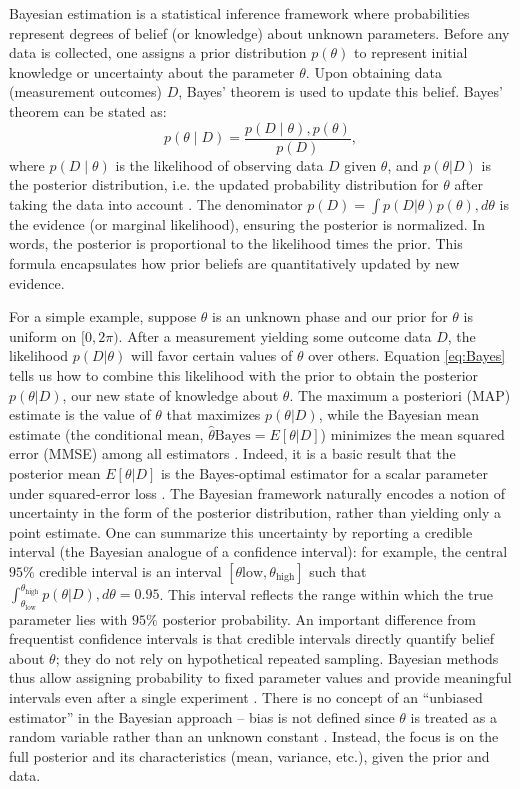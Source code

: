 Bayesian estimation is a statistical inference framework where
probabilities represent degrees of belief (or knowledge) about unknown
parameters. Before any data is collected, one assigns a prior
distribution $p(\theta)$ to represent initial knowledge or uncertainty
about the parameter $\theta$. Upon obtaining data (measurement
outcomes) $D$, Bayes’ theorem is used to update this belief. Bayes’
theorem can be stated as:
\begin{equation}
p(\theta \mid D) = \frac{p(D \mid \theta), p(\theta)}{p(D)},
\label{eq:Bayes}
\end{equation}
where $p(D \mid \theta)$ is the likelihood of observing data $D$ given
$\theta$, and $p(\theta|D)$ is the posterior distribution, i.e. the
updated probability distribution for $\theta$ after taking the data
into account . The denominator $p(D) = \int
p(D|\theta)p(\theta),d\theta$ is the evidence (or marginal
likelihood), ensuring the posterior is normalized. In words, the
posterior is proportional to the likelihood times the prior. This
formula encapsulates how prior beliefs are quantitatively updated by
new evidence.



For a simple example, suppose $\theta$ is an unknown phase and our
prior for $\theta$ is uniform on $[0,2\pi)$. After a measurement
  yielding some outcome data $D$, the likelihood $p(D|\theta)$ will
  favor certain values of $\theta$ over others. Equation
  \eqref{eq:Bayes} tells us how to combine this likelihood with the
  prior to obtain the posterior $p(\theta|D)$, our new state of
  knowledge about $\theta$. The maximum a posteriori (MAP) estimate is
  the value of $\theta$ that maximizes $p(\theta|D)$, while the
  Bayesian mean estimate (the conditional mean,
  $\hat{\theta}{\text{Bayes}} = E[\theta | D]$) minimizes the mean
  squared error (MMSE) among all estimators . Indeed, it is a basic
  result that the posterior mean $E[\theta|D]$ is the Bayes-optimal
  estimator for a scalar parameter under squared-error loss . The
  Bayesian framework naturally encodes a notion of uncertainty in the
  form of the posterior distribution, rather than yielding only a
  point estimate. One can summarize this uncertainty by reporting a
  credible interval (the Bayesian analogue of a confidence interval):
  for example, the central $95\%$ credible interval is an interval
  $[\theta{\text{low}}, \theta_{\text{high}}]$ such that
  $\int_{\theta_{\text{low}}}^{\theta_{\text{high}}}
  p(\theta|D),d\theta = 0.95$. This interval reflects the range within
  which the true parameter lies with $95\%$ posterior probability. An
  important difference from frequentist confidence intervals is that
  credible intervals directly quantify belief about $\theta$; they do
  not rely on hypothetical repeated sampling. Bayesian methods thus
  allow assigning probability to fixed parameter values and provide
  meaningful intervals even after a single experiment . There is no
  concept of an “unbiased estimator” in the Bayesian approach – bias
  is not defined since $\theta$ is treated as a random variable rather
  than an unknown constant . Instead, the focus is on the full
  posterior and its characteristics (mean, variance, etc.), given the
  prior and data.



